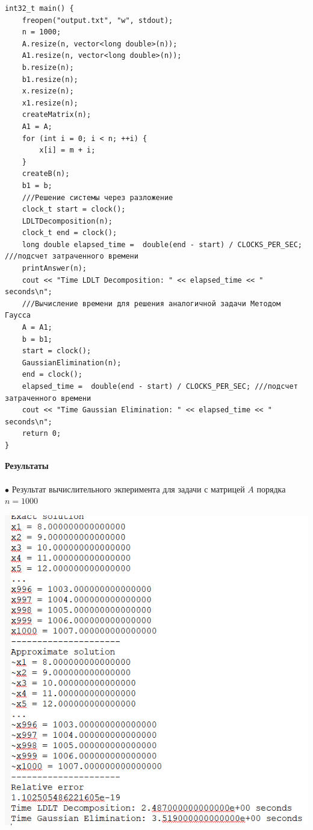 \documentclass[a4paper, 12pt]{report}
\begin{document}
\begin{verbatim}
int32_t main() {
    freopen("output.txt", "w", stdout);
    n = 1000;
    A.resize(n, vector<long double>(n));
    A1.resize(n, vector<long double>(n));
    b.resize(n);
    b1.resize(n);
    x.resize(n);
    x1.resize(n);
    createMatrix(n);
    A1 = A;
    for (int i = 0; i < n; ++i) {
        x[i] = m + i;
    }
    createB(n);
    b1 = b;
    ///Решение системы через разложение
    clock_t start = clock();
    LDLTDecomposition(n);
    clock_t end = clock();
    long double elapsed_time =  double(end - start) / CLOCKS_PER_SEC; ///подсчет затраченного времени
    printAnswer(n);
    cout << "Time LDLT Decomposition: " << elapsed_time << " seconds\n";
    ///Вычисление времени для решения аналогичной задачи Методом Гаусса
    A = A1;
    b = b1;
    start = clock();
    GaussianElimination(n);
    end = clock();
    elapsed_time =  double(end - start) / CLOCKS_PER_SEC; ///подсчет затраченного времени
    cout << "Time Gaussian Elimination: " << elapsed_time << " seconds\n";
    return 0;
}
   \end{verbatim}
   \newpage
   \textbf{\Huge{Результаты}}\\\\
   $\bullet$ Результат вычислительного экперимента для задачи с матрицей $A$ порядка $n = 1000$\\
   \begin{center}
        \includegraphics[scale = 0.7]{pic4.png}
   \end{center}
   
\end{document}
